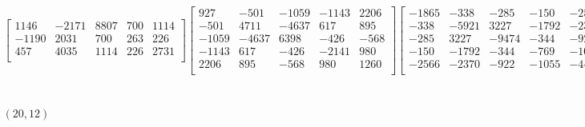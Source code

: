 \documentclass[12pt]{amsart}
\theoremstyle{plain}
\theoremstyle{definition}
\begin{document}
\begin{landscape}
\begin{align*}
\begin{bmatrix}
 1146  &   -2171  &   8807  &   700  &   1114  \\ 
 -1190  &   2031  &   700  &   263  &   226  \\ 
 457  &   4035  &   1114  &   226  &   2731  \\ 
\end{bmatrix}
\begin{bmatrix}
927  &   -501  &   -1059  &   -1143  &   2206  \\ 
 -501  &   4711  &   -4637  &   617  &   895  \\ 
 -1059  &   -4637  &   6398  &   -426  &   -568  \\ 
 -1143  &   617  &   -426  &   -2141  &   980  \\ 
 2206  &   895  &   -568  &   980  &   1260  \\ 
\end{bmatrix}
\begin{bmatrix}
-1865  &   -338  &   -285  &   -150  &   -2566  \\ 
 -338  &   -5921  &   3227  &   -1792  &   -2370  \\ 
 -285  &   3227  &   -9474  &   -344  &   -922  \\ 
 -150  &   -1792  &   -344  &   -769  &   -1055  \\ 
 -2566  &   -2370  &   -922  &   -1055  &   -4485  \\ 
\end{bmatrix}
\\
(20,12) &:
\begin{bmatrix}
524  &   724  &   -3  &   -1043  &   488  \\ 
 724  &   -3078  &   -3271  &   835  &   2109  \\ 
 -3  &   -3271  &   534  &   315  &   -945  \\ 
 -1043  &   835  &   315  &   542  &   309  \\ 
 488  &   2109  &   -945  &   309  &   169  \\ 
\end{bmatrix}
\begin{bmatrix}
-4128  &   -2499  &   -2951  &   1538  &   -1531  \\ 
 -2499  &   -2070  &   -2545  &   1093  &   -1217  \\ 
 -2951  &   -2545  &   -437  &   2308  &   -3543  \\ 
 1538  &   1093  &   2308  &   -2477  &   3035  \\ 
 -1531  &   -1217  &   -3543  &   3035  &   -1928  \\ 
\end{bmatrix}

\end{align*}
\end{landscape}
\end{document}
